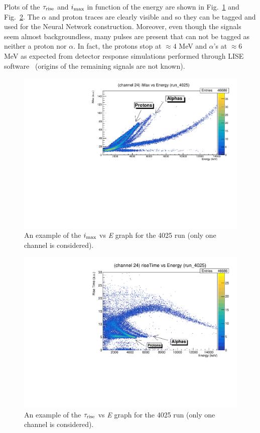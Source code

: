 Plots of the $\tau _{\textup{rise}}$ and $i_{\textup{max}}$ in function of the energy
are shown in Fig.~\ref{imax} and Fig.~\ref{risetime}. The $\alpha$ and proton
traces are clearly visible and so they can be tagged and used for the
Neural Network construction. Moreover, even though the signals seem almost
backgroundless, many pulses are present that can not be tagged as neither a
proton nor $\alpha$. In fact, the protons stop at $\approx 4$ MeV and
$\alpha$'s at $\approx 6$ MeV as expected from detector response simulations
performed through LISE software~\cite{lise} (origins of the remaining signals
are not known).

\begin{figure}[h]
  \centering
  \includegraphics[scale=.6]{img/iMax_4025.pdf}
  \caption{An example of the $i_{\textup{max}}$ vs \textit{E} graph for the 4025 run (only one channel is considered).}
  \label{imax}
\end{figure}

\begin{figure}[h]
  \centering
  \includegraphics[scale=.6]{img/riseTime_4025.pdf}
  \caption{An example of the $\tau _{\textup{rise}}$ vs \textit{E} graph for the 4025 run (only one channel is considered).}
  \label{risetime}
\end{figure}
